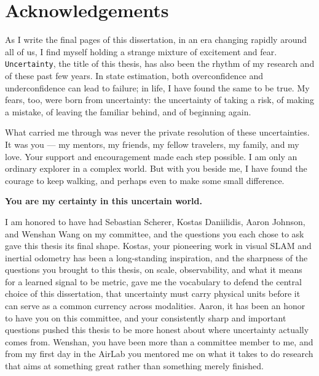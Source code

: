 \chapter*{Acknowledgements}

\providecommand{\ackheading}[1]{%
  \par\addvspace{1.2em}%
  \noindent{\large\bfseries\itshape #1}\par\nobreak\addvspace{0.4em}%
}

As I write the final pages of this dissertation, in an era changing rapidly around all of us, I find myself holding a strange mixture of excitement and fear. \texttt{Uncertainty}, the title of this thesis, has also been the rhythm of my research and of these past few years. In state estimation, both overconfidence and underconfidence can lead to failure; in life, I have found the same to be true. My fears, too, were born from uncertainty: the uncertainty of taking a risk, of making a mistake, of leaving the familiar behind, and of beginning again.

What carried me through was never the private resolution of these uncertainties. It was you — my mentors, my friends, my fellow travelers, my family, and my love. Your support and encouragement made each step possible.
I am only an ordinary explorer in a complex world. But with you beside me, I have found the courage to keep walking, and perhaps even to make some small difference.

\begin{center}
\textbf{You are my certainty in this uncertain world.}
\end{center}


\ackheading{At the Finish Line, to the committee members.}
I am honored to have had Sebastian Scherer, Kostas Daniilidis, Aaron Johnson, and Wenshan Wang on my committee, and the questions you each chose to ask gave this thesis its final shape.
Kostas, your pioneering work in visual SLAM and inertial odometry has been a long-standing inspiration, and the sharpness of the questions you brought to this thesis, on scale, observability, and what it means for a learned signal to be metric, gave me the vocabulary to defend the central choice of this dissertation, that uncertainty must carry physical units before it can serve as a common currency across modalities.
Aaron, it has been an honor to have you on this committee, and your consistently sharp and important questions pushed this thesis to be more honest about where uncertainty actually comes from.
Wenshan, you have been more than a committee member to me, and from my first day in the AirLab you mentored me on what it takes to do research that aims at something great rather than something merely finished.

